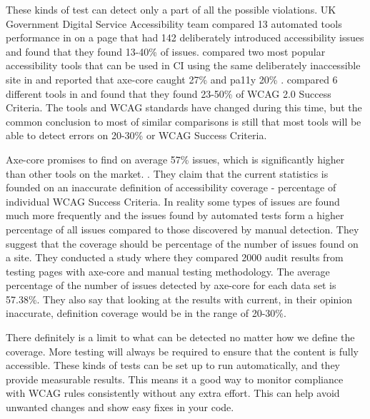 \documentclass{master_thesis}
\begin{document}
These kinds of test can detect only a part of all the possible violations. UK Government Digital Service Accessibility team compared 13 automated tools performance in \citeyear{GAT2018} on a page that had 142 deliberately introduced accessibility issues and found that they found 13-40\% of issues. \citeauthor{Abbott2021} compared two most popular accessibility tools that can be used in CI using the same deliberately inaccessible site in \citeyear{Abbott2021} and reported that axe-core caught 27\% and pa11y 20\% \citep{Abbott2021}. \citeauthor{Vigo2013} compared 6 different tools in \citeyear{Vigo2013} and found that they found 23-50\% of  WCAG 2.0 Success Criteria. \citep{GAT2018,Abbott2021,Vigo2013} The tools and WCAG standards have changed during this time, but the common conclusion to most of similar comparisons is still that most tools will be able to detect errors on 20-30\% or WCAG Success Criteria. 

Axe-core promises to find on average 57\% issues, which is significantly higher than other tools on the market.  \citep{Deque2023}. They claim that the current statistics is founded on an inaccurate definition of accessibility coverage - percentage of individual WCAG Success Criteria. In reality some types of issues are found much more frequently and the issues found by automated tests form a higher percentage of all issues compared to those discovered by manual detection. They suggest that the coverage should be percentage of the number of issues found on a site.  They conducted a study where they compared 2000 audit results from testing pages with axe-core and manual testing methodology. The average percentage of the number of issues detected by axe-core for each data set is 57.38\%. They also say that looking at the results with current, in their opinion inaccurate, definition coverage would be in the range of 20-30\%. \citep{DequeSystems2021report}

There definitely is a limit to what can be detected no matter how we define the coverage. More testing will always be required to ensure that the content is fully accessible. These kinds of tests can be set up to run automatically, and they provide measurable results. This means it a good way to monitor compliance with WCAG rules consistently without any extra effort. This can help avoid unwanted changes and show easy fixes in  your code.

\end{document}
